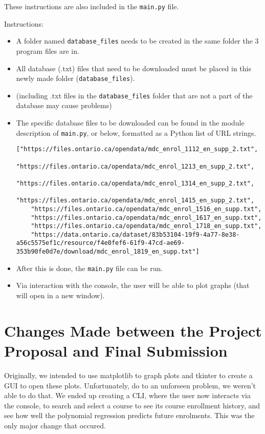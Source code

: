 \documentclass[fontsize=11pt]{article}
\begin{document}
These instructions are also included in the \texttt{main.py} file.

Instructions:
\begin{itemize}
    \item A folder named \texttt{database\_files} needs to be created in the same folder the 3 program files are in.
    \item All database (.txt) files that need to be downloaded must be placed in this newly made folder (\texttt{database\_files}).
    \item (including .txt files in the \texttt{database\_files} folder that are not a part of the database may cause problems)
    \item The specific database files to be downloaded can be found in the module description of \texttt{main.py}, or below, formatted as a Python list of URL strings.

\begin{verbatim}
["https://files.ontario.ca/opendata/mdc_enrol_1112_en_supp_2.txt",
    "https://files.ontario.ca/opendata/mdc_enrol_1213_en_supp_2.txt",
    "https://files.ontario.ca/opendata/mdc_enrol_1314_en_supp_2.txt",
    "https://files.ontario.ca/opendata/mdc_enrol_1415_en_supp_2.txt",
    "https://files.ontario.ca/opendata/mdc_enrol_1516_en_supp.txt",
    "https://files.ontario.ca/opendata/mdc_enrol_1617_en_supp.txt",
    "https://files.ontario.ca/opendata/mdc_enrol_1718_en_supp.txt",
    "https://data.ontario.ca/dataset/83b53104-19f9-4a77-8e38-a56c5575ef1c/resource/f4e0fef6-61f9-47cd-ae69-353b90fe0d7e/download/mdc_enrol_1819_en_supp.txt"]
\end{verbatim}

    \item After this is done, the \texttt{main.py} file can be run.
    \item Via interaction with the console, the user will be able to plot graphs (that will open in a new window).

\end{itemize}


\section*{Changes Made between the Project Proposal and Final Submission}

Originally, we intended to use matplotlib to graph plots and tkinter to create a GUI
to open these plots. Unfortunately, do to an unforseen problem, we weren't able to do that.
We ended up creating a CLI, where the user now interacts via the console, to search and select
a course to see its course enrollment history, and see how well the polynomial regression predicts future enrolments.
This was the only major change that occured.
\end{document}
